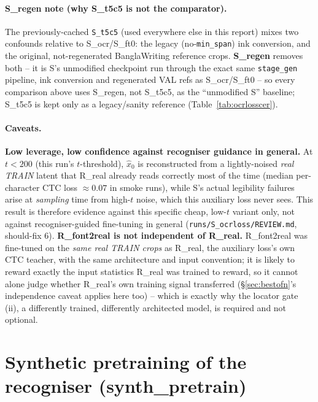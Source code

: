 \documentclass[10.5pt,a4paper]{article}
\newcommand{\fp}[1]{\nolinkurl{#1}}
\begin{document}
\paragraph{S\_regen note (why S\_t5c5 is not the comparator).} The previously-cached \texttt{S\_t5c5} (used everywhere else
in this report) mixes two confounds relative to S\_ocr/S\_ft0: the legacy (no-\texttt{min\_span}) ink conversion, and the
original, not-regenerated BanglaWriting reference crops. \textbf{S\_regen} removes both -- it is S's unmodified checkpoint
run through the exact same \texttt{stage\_gen} pipeline, ink conversion and regenerated VAL refs as S\_ocr/S\_ft0 -- so
every comparison above uses S\_regen, not S\_t5c5, as the ``unmodified S'' baseline; S\_t5c5 is kept only as a
legacy/sanity reference (Table~\ref{tab:ocrlosscer}).

\paragraph{Caveats.} \textbf{Low leverage, low confidence against recogniser guidance in general.} At $t<200$ (this run's
$t$-threshold), $\hat x_0$ is reconstructed from a lightly-noised \emph{real TRAIN} latent that R\_real already reads
correctly most of the time (median per-character CTC loss $\approx0.07$ in smoke runs), while S's actual legibility
failures arise at \emph{sampling} time from high-$t$ noise, which this auxiliary loss never sees. This result is therefore
evidence against this specific cheap, low-$t$ variant only, not against recogniser-guided fine-tuning in general
(\fp{runs/S_ocrloss/REVIEW.md}, should-fix 6). \textbf{R\_font2real is not independent of R\_real.} R\_font2real was
fine-tuned on the \emph{same real TRAIN crops} as R\_real, the auxiliary loss's own CTC teacher, with the same architecture
and input convention; it is likely to reward exactly the input statistics R\_real was trained to reward, so it cannot alone
judge whether R\_real's own training signal transferred (\S\ref{sec:bestofn}'s independence caveat applies here too) --
which is exactly why the locator gate (ii), a differently trained, differently architected model, is required and not
optional.

\section{Synthetic pretraining of the recogniser (synth\_pretrain)}
\label{sec:synthpretrain}
\end{document}
